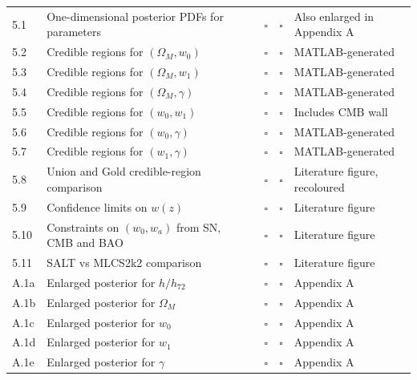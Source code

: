 \documentclass{article}
\newcommand{\done}{\textcolor{green!60!black}{\ding{51}}}
\newcommand{\pending}{$\square$}
\begin{document}
\begin{longtable}{|l|p{4.5cm}|c|c|c|c|p{3cm}|}
5.1 & One-dimensional posterior PDFs for parameters & \done & \done & \pending & \pending &  Also enlarged in Appendix A \\
5.2 & Credible regions for $(\Omega_M,w_0)$ & \done & \done & \pending & \pending &  MATLAB-generated \\
5.3 & Credible regions for $(\Omega_M,w_1)$ & \done & \done & \pending & \pending &  MATLAB-generated \\
5.4 & Credible regions for $(\Omega_M,\gamma)$ & \done & \done & \pending & \pending &  MATLAB-generated \\
5.5 & Credible regions for $(w_0,w_1)$ & \done & \done & \pending & \pending &  Includes CMB wall \\
5.6 & Credible regions for $(w_0,\gamma)$ & \done & \done & \pending & \pending &  MATLAB-generated \\
5.7 & Credible regions for $(w_1,\gamma)$ & \done & \done & \pending & \pending &  MATLAB-generated \\
5.8 & Union and Gold credible-region comparison & \done & \done & \pending & \pending &  Literature figure, recoloured \\
5.9 & Confidence limits on $w(z)$ & \done & \done & \pending & \pending &  Literature figure \\
5.10 & Constraints on $(w_0,w_a)$ from SN, CMB and BAO & \done & \done & \pending & \pending &  Literature figure \\
5.11 & SALT vs MLCS2k2 comparison & \done & \done & \pending & \pending &  Literature figure \\

A.1a & Enlarged posterior for $h/h_{72}$ & \done & \done & \pending & \pending &  Appendix A \\
A.1b & Enlarged posterior for $\Omega_M$ & \done & \done & \pending & \pending &  Appendix A \\
A.1c & Enlarged posterior for $w_0$ & \done & \done & \pending & \pending &  Appendix A \\
A.1d & Enlarged posterior for $w_1$ & \done & \done & \pending & \pending &  Appendix A \\
A.1e & Enlarged posterior for $\gamma$ & \done & \done & \pending & \pending &  Appendix A \\


\end{longtable}
\end{document}
